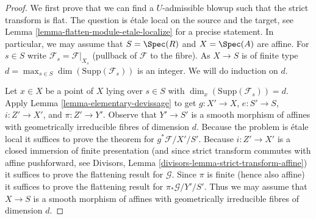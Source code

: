 \begin{proof}
We first prove that we can find a $U$-admissible blowup such that the
strict transform is flat. The question is \'etale local on the source
and the target, see
Lemma \ref{lemma-flatten-module-etale-localize} for a precise statement.
In particular, we may assume that $S = \Spec(R)$ and $X = \Spec(A)$
are affine. For $s \in S$ write $\mathcal{F}_s = \mathcal{F}|_{X_s}$
(pullback of $\mathcal{F}$ to the fibre). As $X \to S$ is of finite type
$d = \max_{s \in S} \dim(\text{Supp}(\mathcal{F}_s))$
is an integer. We will do induction on $d$.

\medskip\noindent
Let $x \in X$ be a point of $X$ lying over $s \in S$ with
$\dim_x(\text{Supp}(\mathcal{F}_s)) = d$.
Apply Lemma \ref{lemma-elementary-devissage} to get
$g : X' \to X$, $e : S' \to S$, $i : Z' \to X'$, and $\pi : Z' \to Y'$.
Observe that $Y' \to S'$ is
a smooth morphism of affines with geometrically irreducible fibres
of dimension $d$. Because the problem is \'etale local it suffices
to prove the theorem for $g^*\mathcal{F}/X'/S'$. Because $i : Z' \to X'$
is a closed immersion of finite presentation (and since strict transform
commutes with affine pushforward, see
Divisors, Lemma \ref{divisors-lemma-strict-transform-affine})
it suffices to prove the flattening result for $\mathcal{G}$.
Since $\pi$ is finite (hence also affine) it suffices to prove the
flattening result for $\pi_*\mathcal{G}/Y'/S'$. Thus we may assume
that $X \to S$ is a smooth morphism of affines with geometrically
irreducible fibres of dimension $d$.


\end{proof}
